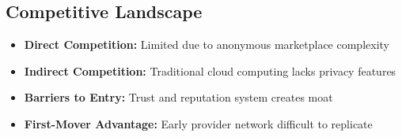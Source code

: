 \subsection{Competitive Landscape}
\begin{itemize}
  \item \textbf{Direct Competition:} Limited due to anonymous marketplace complexity
  \item \textbf{Indirect Competition:} Traditional cloud computing lacks privacy features
  \item \textbf{Barriers to Entry:} Trust and reputation system creates moat
  \item \textbf{First-Mover Advantage:} Early provider network difficult to replicate
\end{itemize}
